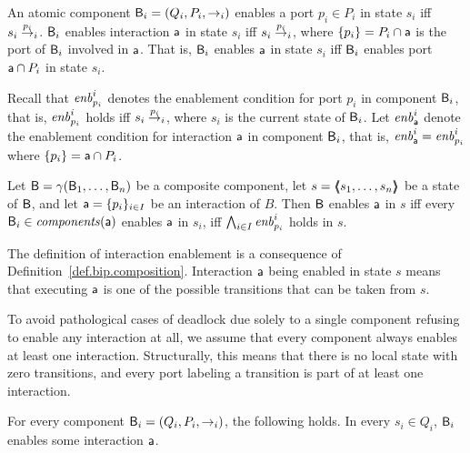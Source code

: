 \begin{definition}\label{def.bip.enablement} 
An atomic component $\B_i = (Q_i,P_i,\goesto_i)$ enables a port $p_i \in P_i$ in state $s_i$ iff $s_i \goesto[p_i]_i$.
$\B_i$ enables interaction $\act$ in state $s_i$ iff $s_i \goesto[p_i]_i$, where $\set{p_i} = P_i \ints \act$ is the port of $\B_i$ involved in $\act$.
That is, $\B_i$ enables $\act$ in state $s_i$ iff $\B_i$ enables port $\act \ints P_i$ in state $s_i$. 

Recall that $\gd{p_i}{i}$ denotes the enablement condition for port $p_i$ in component $\B_i$, that is, $\gd{p_i}{i}$ holds iff
$s_i \goesto[p_i]_i$, where $s_i$ is the current state of $\B_i$.
Let $\gd{\act}{i}$ denote the enablement condition for interaction $\act$ in
component $\B_i$, that is,  $\gd{\act}{i} = \gd{p_i}{i}$ where $\set{p_i} = \act \ints P_i$.  

Let $\B = \gamma(\B_1,\dots,\B_n)$ be a composite component, let
$s = \tpl{s_1,\ldots,s_n}$ be a state of $\B$,
and let $\act = \{p_i\}_{i\in I}$ be an interaction of $B$.
Then $\B$ enables $\act$ in $s$
iff every $\B_i \in \cmps{\act}$ enables $\act$ in $s_i$, \ie iff
$\AND_{i \in I} \gd{p_i}{i}$ holds in $s$.
\end{definition}
%
The definition of  interaction enablement is a consequence of 
Definition~\ref{def.bip.composition}. 
Interaction $\act$ being enabled in state $s$ means that executing
$\act$ is one of the possible transitions that can be taken from $s$.

To avoid pathological cases of deadlock due solely to a single component refusing to enable any interaction at all, 
we assume that every component always enables at least one interaction.
Structurally, this means that there is no local state with zero transitions, 
and every port labeling a transition is 
part of at least one interaction. 

\begin{definition} \label{def.bip.local-enablement}
For every component  $\B_i = (Q_i,P_i,\goesto_i)$, the following holds. 
  In every $s_i \in Q_i$, $\B_i$ enables some
interaction $\act$.
\end{definition}

